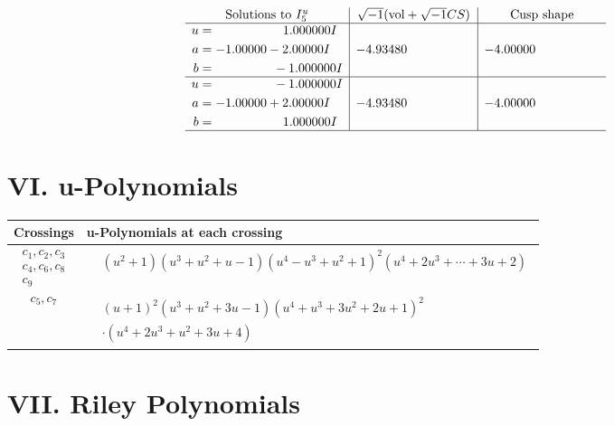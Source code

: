 \documentclass[1p]{elsarticle_modified}
\theoremstyle{definition}
\newcommand{\I}{\sqrt{-1}}
\begin{document}
$$\begin{array}{c|c|c}  
\text{Solutions to }I^u_{5}& \I (\text{vol} + \sqrt{-1}CS) & \text{Cusp shape}\\
 \hline 
\begin{aligned}
u &= \phantom{-0.000000 -}1.000000 I \\
a &= -1.00000 - 2.00000 I \\
b &= \phantom{-0.000000 } -1.000000 I\end{aligned}
 & -4.93480\phantom{ +0.000000I} & -4.00000\phantom{ +0.000000I} \\ \hline\begin{aligned}
u &= \phantom{-0.000000 } -1.000000 I \\
a &= -1.00000 + 2.00000 I \\
b &= \phantom{-0.000000 -}1.000000 I\end{aligned}
 & -4.93480\phantom{ +0.000000I} & -4.00000\phantom{ +0.000000I}\\
 \hline 
 \end{array}$$\newpage
\newpage\renewcommand{\arraystretch}{1}
\centering \section*{ VI. u-Polynomials}
\begin{tabular}{m{50pt}|m{274pt}}
Crossings & \hspace{64pt}u-Polynomials at each crossing \\
\hline $$\begin{aligned}c_{1},c_{2},c_{3}\\c_{4},c_{6},c_{8}\\c_{9}\end{aligned}$$&$\begin{aligned}
&(u^2+1)(u^3+u^2+u-1)(u^4- u^3+u^2+1)^{2}(u^{4}+2 u^{3}+\cdots+3 u+2)
\end{aligned}$\\
\hline $$\begin{aligned}c_{5},c_{7}\end{aligned}$$&$\begin{aligned}
&(u+1)^2(u^3+u^2+3 u-1)(u^4+u^3+3 u^2+2 u+1)^2\\
&\cdot(u^4+2 u^3+u^2+3 u+4)
\end{aligned}$\\
\hline
\end{tabular}\newpage\renewcommand{\arraystretch}{1}
\centering \section*{ VII. Riley Polynomials}
\end{document}
